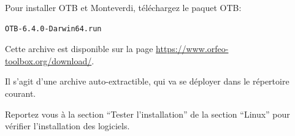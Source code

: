 \documentclass[10pt,a4paper]{article}
\begin{document}
Pour installer OTB et Monteverdi, téléchargez le paquet OTB:

\begin{verbatim}
OTB-6.4.0-Darwin64.run
\end{verbatim}

Cette archive est disponible sur la page \url{https://www.orfeo-toolbox.org/download/}.

Il s'agit d'une archive auto-extractible, qui va se déployer dans le répertoire
courant.

Reportez vous à la section ``Tester l'installation'' de la section ``Linux''
pour vérifier l'installation des logiciels.
\end{document}
